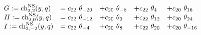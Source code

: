 \begin{equation}
  \begin{array}{lllll}
G := {\rm ch}_{2,2}^{\rm NS}(y,q) &= c_{22}~\theta_{-20} &+
c_{20}~\theta_{-8} &+ c_{22}~\theta_{4} &+ c_{20}~\theta_{16}\\ 
H := {\rm ch}_{2,0}^{\rm NS}(y,q) &= c_{22}~\theta_{-12} &+
c_{20}~\theta_{0} &+ c_{22}~\theta_{12} &+ c_{20}~\theta_{24}\\ 
I := {\rm ch}_{2,-2}^{\rm NS}(y,q) &= c_{22}~\theta_{-4} &+
c_{20}~\theta_{8} &+ c_{22}~\theta_{20} &+ c_{20}~\theta_{-16} \\
  \end{array}
\end{equation}

